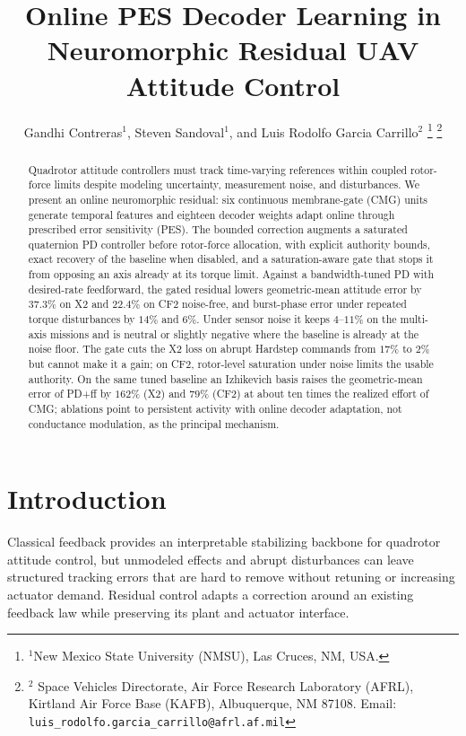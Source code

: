 \documentclass[letterpaper, 10 pt, conference]{ieeeconf}
\title{\LARGE \bf Online PES Decoder Learning in Neuromorphic Residual UAV Attitude Control}
\author{Gandhi Contreras$^{1}$, Steven Sandoval$^{1}$, and Luis Rodolfo Garcia Carrillo$^{2}$%
\thanks{$^{1}$New Mexico State University (NMSU), Las Cruces, NM, USA.}%
\thanks{$^{2}$ Space Vehicles Directorate, Air Force Research Laboratory (AFRL), Kirtland Air Force Base (KAFB), Albuquerque, NM 87108.
    Email: {\tt\small luis\_rodolfo.garcia\_carrillo@afrl.af.mil}}%
}
\begin{document}
\maketitle



\begin{abstract}
Quadrotor attitude controllers must track time-varying references within coupled rotor-force limits despite modeling uncertainty, measurement noise, and disturbances. We present an online neuromorphic residual: six continuous membrane-gate (CMG) units generate temporal features and eighteen decoder weights adapt online through prescribed error sensitivity (PES). The bounded correction augments a saturated quaternion PD controller before rotor-force allocation, with explicit authority bounds, exact recovery of the baseline when disabled, and a saturation-aware gate that stops it from opposing an axis already at its torque limit. Against a bandwidth-tuned PD with desired-rate feedforward, the gated residual lowers geometric-mean attitude error by $37.3\%$ on X2 and $22.4\%$ on CF2 noise-free, and burst-phase error under repeated torque disturbances by $14\%$ and $6\%$. Under sensor noise it keeps $4$--$11\%$ on the multi-axis missions and is neutral or slightly negative where the baseline is already at the noise floor. The gate cuts the X2 loss on abrupt Hardstep commands from $17\%$ to $2\%$ but cannot make it a gain; on CF2, rotor-level saturation under noise limits the usable authority. On the same tuned baseline an Izhikevich basis raises the geometric-mean error of PD+ff by $162\%$ (X2) and $79\%$ (CF2) at about ten times the realized effort of CMG; ablations point to persistent activity with online decoder adaptation, not conductance modulation, as the principal mechanism.
\end{abstract}

\section{Introduction}
Classical feedback provides an interpretable stabilizing backbone for quadrotor attitude control, but unmodeled effects and abrupt disturbances can leave structured tracking errors that are hard to remove without retuning or increasing actuator demand. Residual control adapts a correction around an existing feedback law while preserving its plant and actuator interface.
\end{document}
